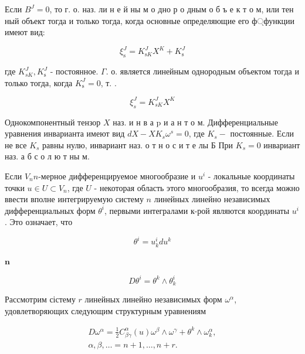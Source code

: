\documentclass[10pt]{article}
\begin{document}
Если $B^{J}=0$, то г. о. наз. ли н е й ны м о дно р о дным о б ъ е к т о м, или тен ный объект тогда и только тогда, когда основные определяющие его ф্функции имеют вид:



\[

\xi_{\mathrm{s}}^{J}=K_{\mathrm{s} K}^{J} X^{K}+K_{\mathrm{s}}^{J}

\]



где $K_{s K}^{J}, K_{\mathrm{s}}^{J}$ - постоянное. $\Gamma$. о. является линейным однородным объектом тогда и только тогда, когда $K_{\mathrm{s}}^{J}=0$, т. .



\[

\xi_{s}^{J}=K_{s K}^{J} X^{K}

\]



Однокомпонентный тензор $X$ наз. и н в а $\mathrm{p}$ и а н т о м. Дифференциальные уравнения инварианта имеют вид $d X-X K_{s} \omega^{s}=0$, где $K_{s}-$ постоянные. Если не все $K_{s}$ равны нулю, инвариант наз. о т н о с и т е лы Б При $K_{s}=0$ инвариант наз. а б с о л ю т ны м.



Если $V_{n} n$-мерное дифференцируемое многообразие и $u^{i}$ - локальные координаты точки $u \in U \subset V_{n}$, где $U$ - некоторая область этого многообразия, то всегда можно ввести вполне интегрируемую систему $n$ линейных линейно независимых дифференциальных форм $\theta^{i}$, первыми интегралами к-рой являются координаты $u^{i}$. Это означает, что



\[

\theta^{i}=u_{k}^{i} d u^{k}

\]



$\mathbf{n}$



\[

D \theta^{i}=\theta^{k} \wedge \theta_{k}^{i}

\]



Рассмотрим сістему $r$ линейных линейно независимых форм $\omega^{\alpha}$, удовлетворяющих следующим структурным уравнениям



\[

\begin{gathered}

D \omega^{\alpha}=\frac{1}{2} C_{\beta \gamma}^{\alpha}(u) \omega^{\beta} \wedge \omega^{\gamma}+\theta^{k} \wedge \omega_{k}^{\alpha}, \\

\alpha, \beta, \ldots=n+1, \ldots, n+r .

\end{gathered}

\]
\end{document}

